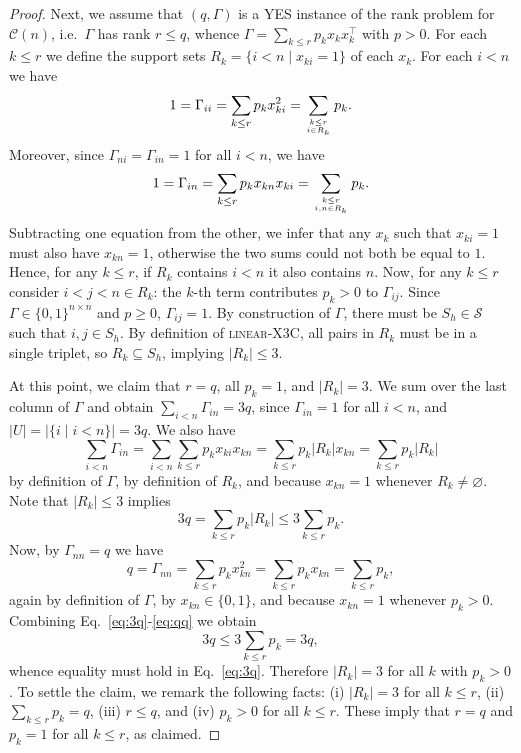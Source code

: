 \documentclass[10pt,a4paper]{amsart}
\newcommand{\CONX}[1]{\mathcal{C}(#1)}
\newcommand{\transpose}[1]{{#1}^{\top}}
\begin{document}
\begin{proof}
  Next, we assume that $(q,\Gamma)$ is a YES instance of the rank problem for $\CONX{n}$, i.e.~$\Gamma$  has rank $r\le q$, whence $\Gamma=\sum_{k\le r} p_k x_k\transpose{x}_k$ with $p>0$. For each $k\le r$ we define the support sets $R_k=\{i<n\;|\;x_{ki}=1\}$ of each $x_k$. For each $i<n$ we have
  \begin{equation}
    1=\Gamma_{ii}=\sum_{k\le r} p_k x_{ki}^2=\sum_{k\le r\atop i\in R_k} p_k.
    \label{eq:ii}
  \end{equation}
  Moreover, since $\Gamma_{ni}=\Gamma_{in}=1$ for all $i<n$, we have
  \[1=\Gamma_{in}=\sum_{k\le r} p_k x_{kn}x_{ki}=\sum_{k\le r\atop i,n\in R_k} p_k.\]
  Subtracting one equation from the other, we infer that any $x_k$ such that $x_{ki}=1$ must also have $x_{kn}=1$, otherwise the two sums could not both  be equal to $1$. Hence, for any $k\le r$, if $R_k$ contains $i<n$ it also contains $n$. Now, for any $k\le r$ consider $i<j<n\in R_k$: the $k$-th term contributes $p_k>0$ to $\Gamma_{ij}$. Since $\Gamma\in\{0,1\}^{n\times n}$ and $p\ge 0$, $\Gamma_{ij}=1$. By construction of $\Gamma$, there must be $S_h\in\mathcal{S}$ such that $i,j\in S_h$. By definition of \textsc{linear}-X3C, all pairs in $R_k$ must be in a single triplet, so $R_k\subseteq S_h$, implying $|R_k|\le 3$.

  At this point, we claim that $r=q$, all $p_k=1$, and $|R_k|=3$. We sum over the last column of $\Gamma$ and obtain $\sum_{i<n}\Gamma_{in}=3q$, since $\Gamma_{in}=1$ for all $i<n$, and $|U|=|\{i\;|\;i<n\}|=3q$. We also have
  \[\sum_{i<n}\Gamma_{in}=\sum_{i<n}\sum_{k\le r}p_k x_{ki} x_{kn}=\sum_{k\le r}p_k|R_k| x_{kn}=\sum_{k\le r}p_k|R_k|\]
  by definition of $\Gamma$, by definition of $R_k$, and because $x_{kn}=1$ whenever $R_k\not=\varnothing$. Note that $|R_k|\le 3$ implies
  \begin{equation}
    3q = \sum_{k\le r} p_k|R_k|\le 3\sum_{k\le r}p_k.
    \label{eq:3q}
  \end{equation}
  Now, by $\Gamma_{nn}=q$ we have
  \begin{equation}
    q = \Gamma_{nn}=\sum_{k\le r} p_k x_{kn}^2 =\sum_{k\le r} p_k x_{kn}=\sum_{k\le r} p_k,
    \label{eq:qq}
  \end{equation}
  again by definition of $\Gamma$, by $x_{kn}\in\{0,1\}$, and because $x_{kn}=1$ whenever $p_k>0$. Combining Eq.~\eqref{eq:3q}-\eqref{eq:qq} we obtain
  \[3q\le 3\sum_{k\le r} p_k = 3q,\]
  whence equality must hold in Eq.~\eqref{eq:3q}. Therefore $|R_k|=3$ for all $k$ with $p_k>0$. To settle the claim, we remark the following facts: (i) $|R_k|=3$ for all $k\le r$, (ii) $\sum_{k\le r} p_k=q$, (iii) $r\le q$, and (iv) $p_k>0$ for all $k\le r$. These imply that $r=q$ and $p_k=1$ for all $k\le r$, as claimed.
  

\end{proof}
\end{document}
